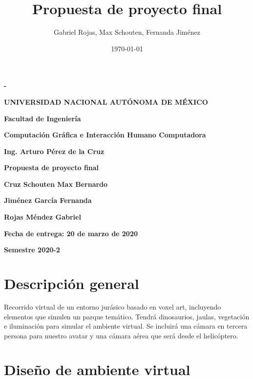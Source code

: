 \documentclass[12pt]{article} %
\title{Propuesta de proyecto final}
\author{Gabriel Rojas, Max Schouten, Fernanda Jiménez}
\date{\today}
\begin{document}
	\begin{titlepage}
		\thispagestyle{fancy}
		\centering
		{\bfseries - \par}
		\vspace{1cm}
		{\bfseries\LARGE UNIVERSIDAD NACIONAL AUTÓNOMA DE MÉXICO \par}
		\vspace{1cm}
		{\bfseries\LARGE Facultad de Ingeniería \par}
		\vspace{1cm}
		{\bfseries\LARGE Computación Gráfica e Interacción Humano Computadora \par}
		\vspace{1cm}
		{\bfseries\LARGE Ing. Arturo Pérez de la Cruz \par}
		\vspace{1cm}
		{\bfseries\LARGE Propuesta de proyecto final \par}
		\vspace{1cm}
		{\bfseries\LARGE Cruz Schouten Max Bernardo \par}
		{\bfseries\LARGE Jiménez García Fernanda \par}
		{\bfseries\LARGE Rojas Méndez Gabriel \par}
		\vspace{1cm}
		{\bfseries\LARGE Fecha de entrega: 20 de marzo de 2020 \par}
		\vspace{1cm}
		{\bfseries\LARGE Semestre 2020-2 \par}
	\end{titlepage}
	
	
	\newpage
	
	\section{Descripción general}
	
	\setlength{\parindent}{1.0cm}
	Recorrido virtual de un entorno jurásico basado en voxel art, incluyendo elementos que simulen un parque temático. 
	Tendrá dinosaurios, jaulas, vegetación e iluminación para simular el ambiente virtual. 
	Se incluirá una cámara en tercera persona para nuestro avatar y una cámara aérea que será desde el helicóptero.
	\setlength{\parindent}{0.0cm}
	
	\section{Diseño de ambiente virtual}
	
\end{document}
